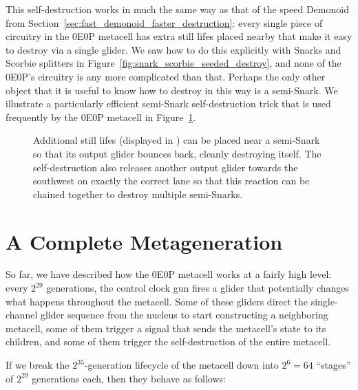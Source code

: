This self-destruction works in much the same way as that of the speed Demonoid from Section~\ref{sec:fast_demonoid_faster_destruction}: every single piece of circuitry in the 0E0P metacell has extra still lifes placed nearby that make it easy to destroy via a single glider. We saw how to do this explicitly with Snarks and Scorbie splitters in Figure~\ref{fig:snark_scorbie_seeded_destroy}, and none of the 0E0P's circuitry is any more complicated than that. Perhaps the only other object that it is useful to know how to destroy in this way is a semi-Snark. We illustrate a particularly efficient semi-Snark self-destruction trick that is used frequently by the 0E0P metacell in Figure~\ref{fig:semi_snark_self_destruct}.

\begin{figure}[!htb]
	\centering
	\caption{Additional still lifes (displayed in ) can be placed near a semi-Snark so that its output glider bounces back, cleanly destroying itself. The self-destruction also releases another output glider towards the southwest on exactly the correct lane so that this reaction can be chained together to destroy multiple semi-Snarks.}
	\label{fig:semi_snark_self_destruct}
\end{figure}


\section{A Complete Metageneration}\label{sec:0e0p_timeline}

So far, we have described how the 0E0P metacell works at a fairly high level: every $2^{29}$ generations, the control clock gun fires a glider that potentially changes what happens throughout the metacell. Some of these gliders direct the single-channel glider sequence from the nucleus to start constructing a neighboring metacell, some of them trigger a signal that sends the metacell's state to its children, and some of them trigger the self-destruction of the entire metacell.

If we break the $2^{35}$-generation lifecycle of the metacell down into $2^6 = 64$ ``stages'' of $2^{29}$ generations each, then they behave as follows:\smallskip

